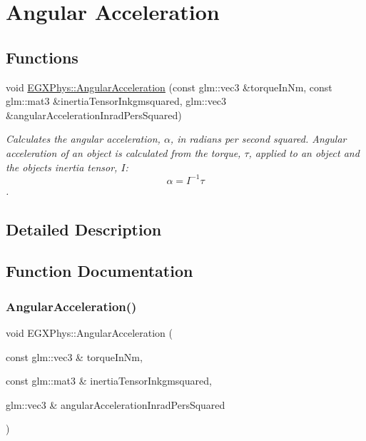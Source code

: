 \hypertarget{group___e_g_x_phys-_kinetics-_angular_acceleration}{}\section{Angular Acceleration}
\label{group___e_g_x_phys-_kinetics-_angular_acceleration}
\subsection*{Functions}
\begin{DoxyCompactItemize}
\item 
void \mbox{\hyperlink{group___e_g_x_phys-_kinetics-_angular_acceleration_gaf636e9a30f3db4e170829efbf40efbbe}{E\+G\+X\+Phys\+::\+Angular\+Acceleration}} (const glm\+::vec3 \&torque\+In\+Nm, const glm\+::mat3 \&inertia\+Tensor\+Inkgmsquared, glm\+::vec3 \&angular\+Acceleration\+Inrad\+Pers\+Squared)
\begin{DoxyCompactList}\small\item\em Calculates the angular acceleration, $\alpha$, in radians per second squared. Angular acceleration of an object is calculated from the torque, $\tau$, applied to an object and the object\textquotesingle{}s inertia tensor, $I$\+: \[\alpha=I^{-1} \tau \]. \end{DoxyCompactList}\end{DoxyCompactItemize}


\subsection{Detailed Description}


\subsection{Function Documentation}
\mbox{\label{group___e_g_x_phys-_kinetics-_angular_acceleration_gaf636e9a30f3db4e170829efbf40efbbe}} 
\subsubsection{\texorpdfstring{Angular\+Acceleration()}{AngularAcceleration()}}
{\footnotesize\ttfamily void E\+G\+X\+Phys\+::\+Angular\+Acceleration (\begin{DoxyParamCaption}\item[{const glm\+::vec3 \&}]{torque\+In\+Nm,  }\item[{const glm\+::mat3 \&}]{inertia\+Tensor\+Inkgmsquared,  }\item[{glm\+::vec3 \&}]{angular\+Acceleration\+Inrad\+Pers\+Squared }\end{DoxyParamCaption})}



